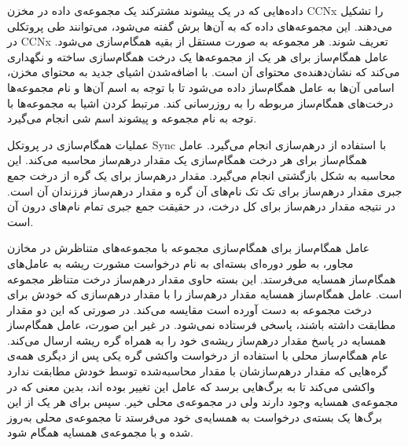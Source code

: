 داده‌هایی که در یک پیشوند مشترکند یک مجموعه‌ی داده در مخزن CCNx را تشکیل می‌دهند. این مجموعه‌های داده که به آن‌ها برش گفته می‌شود، می‌توانند طی پروتکلی در CCNx تعریف شوند. هر مجموعه به صورت مستقل از بقیه همگام‌سازی می‌شود. عامل همگام‌ساز برای هر یک از مجموعه‌ها یک درخت همگام‌سازی ساخته و نگهداری می‌کند که نشان‌دهنده‌ی محتوای آن است. با اضافه‌شدن اشیای جدید به محتوای مخزن، اسامی آن‌ها به عامل همگام‌ساز داده می‌شود تا با توجه به اسم آن‌ها و نام مجموعه‌ها درخت‌های همگام‌ساز مربوطه را به روزرسانی کند. مرتبط کردن اشیا به مجموعه‌ها با توجه به نام مجموعه و پیشوند اسم شی انجام می‌گیرد.

عملیات همگام‌سازی در پروتکل Sync با استفاده از در‌هم‌سازی انجام می‌گیرد. عامل همگام‌ساز برای هر درخت همگام‌سازی یک مقدار در‌هم‌ساز محاسبه می‌کند. این محاسبه به شکل بازگشتی انجام می‌گیرد. مقدار درهم‌ساز برای یک گره از درخت جمع جبری مقدار در‌هم‌ساز برای تک تک نام‌های آن گره و مقدار در‌هم‌ساز فرزندان آن است. در نتیجه مقدار در‌هم‌ساز برای کل درخت، در حقیقت جمع جبری تمام نا‌م‌های درون آن است. 

عامل همگام‌ساز برای همگام‌سازی مجموعه با مجموعه‌های متناظرش در مخازن مجاور، به طور دوره‌ای بسته‌ای به نام درخواست مشورت ریشه به عامل‌های همگام‌ساز همسایه می‌فرستد. این بسته حاوی مقدار درهم‌ساز درخت متناظر مجموعه است. عامل همگام‌ساز همسایه مقدار در‌هم‌ساز را با مقدار در‌هم‌سازی که خودش برای درخت مجموعه به دست آورده است مقایسه می‌کند. در صورتی که این دو مقدار مطابقت داشته باشند، پاسخی فرستاده نمی‌شود. در غیر این صورت، عامل همگام‌ساز همسایه در پاسخ مقدار در‌هم‌ساز ریشه‌ی خود را به همراه گره ریشه ارسال می‌کند. عام همگام‌ساز محلی با استفاده از درخواست واکشی گره یکی پس از دیگری همه‌ی گره‌هایی که مقدار در‌هم‌سازشان با مقدار محاسبه‌شده توسط خودش مطابقت ندارد واکشی می‌کند تا به برگ‌هایی برسد که عامل این تغییر بوده اند، بدین معنی که در مجموعه‌ی همسایه وجود دارند ولی در مجموعه‌ی محلی خیر. سپس برای هر یک از این برگ‌ها یک بسته‌ی درخواست به همسایه‌ی خود می‌فرستد تا مجموعه‌ی محلی به‌روز شده و با مجموعه‌ی همسایه همگام شود.
 	

